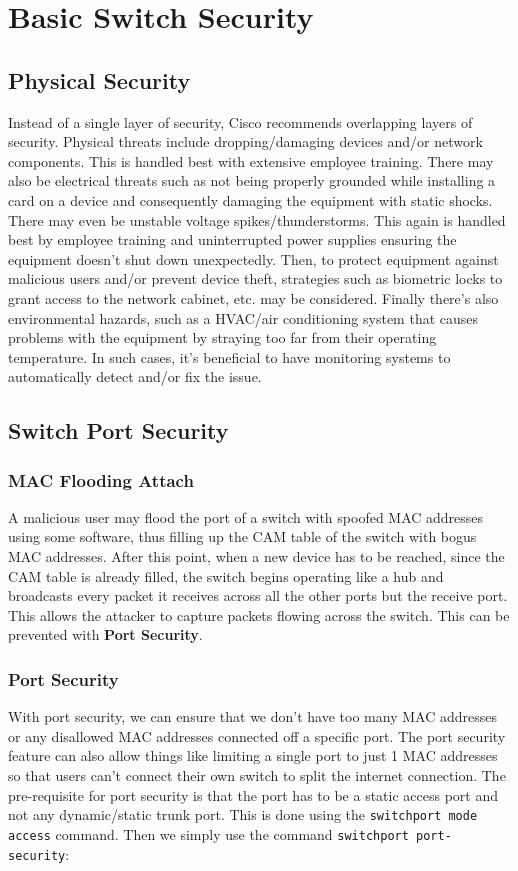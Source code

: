 \chapter{Basic Switch Security}
\section{Physical Security}
Instead of a single layer of security, Cisco recommends overlapping layers of security. Physical threats include dropping/damaging devices and/or network components. This is handled best with extensive employee training. There may also be electrical threats such as not being properly grounded while installing a card on a device and consequently damaging the equipment with static shocks. There may even be unstable voltage spikes/thunderstorms. This again is handled best by employee training and uninterrupted power supplies ensuring the equipment doesn't shut down unexpectedly. Then, to protect equipment against malicious users and/or prevent device theft, strategies such as biometric locks to grant access to the network cabinet, etc. may be considered. Finally there's also environmental hazards, such as a HVAC/air conditioning system that causes problems with the equipment by straying too far from their operating temperature. In such cases, it's beneficial to have monitoring systems to automatically detect and/or fix the issue. 

\section{Switch Port Security}
\subsection{MAC Flooding Attach}
A malicious user may flood the port of a switch with spoofed MAC addresses using some software, thus filling up the CAM table of the switch with bogus MAC addresses. After this point, when a new device has to be reached, since the CAM table is already filled, the switch begins operating like a hub and broadcasts every packet it receives across all the other ports but the receive port. This allows the attacker to capture packets flowing across the switch. This can be prevented with \textbf{Port Security}.

\subsection{Port Security}
With port security, we can ensure that we don't have too many MAC addresses or any disallowed MAC addresses connected off a specific port. The port security feature can also allow things like limiting a single port to just 1 MAC addresses so that users can't connect their own switch to split the internet connection. The pre-requisite for port security is that the port has to be a static access port and not any dynamic/static trunk port. This is done using the \verb|switchport mode access| command. Then we simply use the command \verb|switchport port-security|: 

